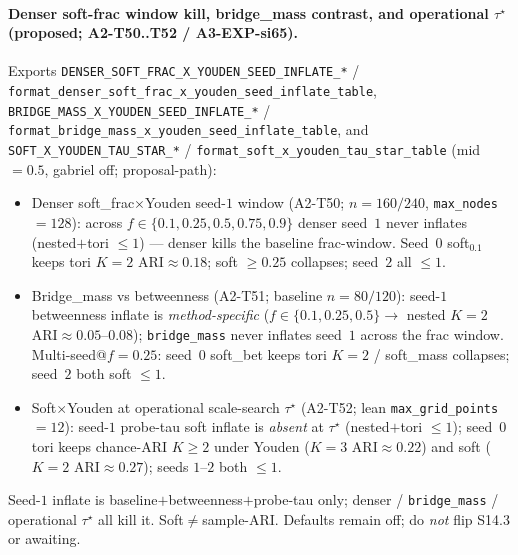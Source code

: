 \documentclass[11pt]{article}
\begin{document}
\paragraph{Denser soft-frac window kill, bridge\_mass contrast, and
operational $\tau^\star$ (proposed; A2-T50..T52 / A3-EXP-si65).}
Exports \texttt{DENSER\_SOFT\_FRAC\_X\_YOUDEN\_SEED\_INFLATE\_*} /
\texttt{format\_denser\_soft\_frac\_x\_youden\_seed\_inflate\_table},
\texttt{BRIDGE\_MASS\_X\_YOUDEN\_SEED\_INFLATE\_*} /
\texttt{format\_bridge\_mass\_x\_youden\_seed\_inflate\_table}, and
\texttt{SOFT\_X\_YOUDEN\_TAU\_STAR\_*} /
\texttt{format\_soft\_x\_youden\_tau\_star\_table}
(mid${=}0.5$, gabriel off; proposal-path):
\begin{itemize}[leftmargin=1.5em]
  \item Denser soft\_frac$\times$Youden seed-$1$ window (A2-T50;
  $n{=}160/240$, \texttt{max\_nodes}${=}128$): across
  $f\in\{0.1,0.25,0.5,0.75,0.9\}$ denser seed~$1$ never inflates
  (nested$+$tori $\le 1$) --- denser kills the baseline frac-window.
  Seed~$0$ soft$_{0.1}$ keeps tori $K{=}2$ ARI$\approx 0.18$; soft
  $\ge 0.25$ collapses; seed~$2$ all $\le 1$.
  \item Bridge\_mass vs betweenness (A2-T51; baseline $n{=}80/120$):
  seed-$1$ betweenness inflate is \emph{method-specific}
  ($f\in\{0.1,0.25,0.5\}\to$ nested $K{=}2$ ARI$\approx 0.05$--$0.08$);
  \texttt{bridge\_mass} never inflates seed~$1$ across the frac window.
  Multi-seed@$f{=}0.25$: seed~$0$ soft\_bet keeps tori $K{=}2$ /
  soft\_mass collapses; seed~$2$ both soft $\le 1$.
  \item Soft$\times$Youden at operational scale-search $\tau^\star$
  (A2-T52; lean \texttt{max\_grid\_points}${=}12$): seed-$1$ probe-tau
  soft inflate is \emph{absent} at $\tau^\star$ (nested$+$tori $\le 1$);
  seed~$0$ tori keeps chance-ARI $K\ge 2$ under Youden ($K{=}3$
  ARI$\approx 0.22$) and soft ($K{=}2$ ARI$\approx 0.27$); seeds
  $1$--$2$ both $\le 1$.
\end{itemize}
Seed-$1$ inflate is baseline$+$betweenness$+$probe-tau only; denser /
\texttt{bridge\_mass} / operational $\tau^\star$ all kill it.
Soft$\neq$sample-ARI. Defaults remain off; do \emph{not} flip S14.3 or
awaiting.
\end{document}
